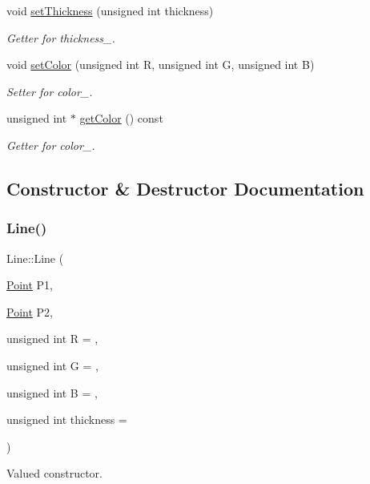\begin{DoxyCompactItemize}
void \mbox{\hyperlink{class_line_a5cdf7e1a28d4a4ff1d2411e78ae8909e}{set\+Thickness}} (unsigned int thickness)
\begin{DoxyCompactList}\small\item\em Getter for thickness\+\_\+. \end{DoxyCompactList}\item 
void \mbox{\hyperlink{class_line_a33aadb66d642f9e15eb8c38b31003052}{set\+Color}} (unsigned int R, unsigned int G, unsigned int B)
\begin{DoxyCompactList}\small\item\em Setter for color\+\_\+. \end{DoxyCompactList}\item 
unsigned int $\ast$ \mbox{\hyperlink{class_line_ac28e72010059953c08682c08ca9823ca}{get\+Color}} () const
\begin{DoxyCompactList}\small\item\em Getter for color\+\_\+. \end{DoxyCompactList}\end{DoxyCompactItemize}


\subsection{Constructor \& Destructor Documentation}
\mbox{\label{class_line_a2969d6c2a73284a477831915977995fd}} 
\subsubsection{\texorpdfstring{Line()}{Line()}}
{\footnotesize\ttfamily Line\+::\+Line (\begin{DoxyParamCaption}\item[{\mbox{\hyperlink{class_point}{Point}}}]{P1,  }\item[{\mbox{\hyperlink{class_point}{Point}}}]{P2,  }\item[{unsigned int}]{R = {},  }\item[{unsigned int}]{G = {},  }\item[{unsigned int}]{B = {},  }\item[{unsigned int}]{thickness = {} }\end{DoxyParamCaption})}



Valued constructor. 



